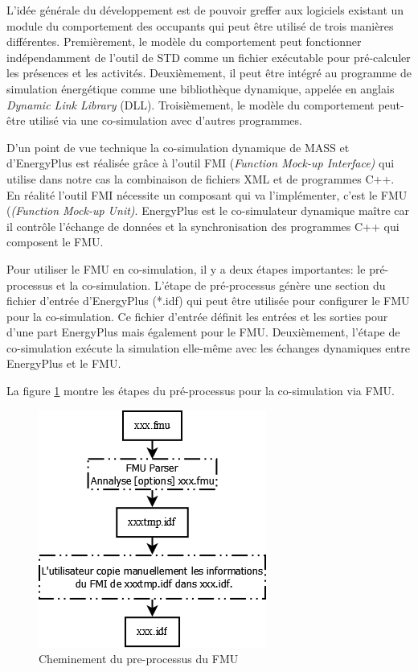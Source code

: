 L'idée générale du développement est de pouvoir greffer aux logiciels existant un module du comportement des occupants qui peut être utilisé de trois manières différentes. Premièrement, le modèle du comportement peut fonctionner indépendamment de l'outil de STD comme un fichier exécutable pour pré-calculer les présences et les activités. Deuxièmement, il peut être intégré au programme de simulation énergétique comme une bibliothèque dynamique, appelée en anglais \textit{Dynamic Link Library} (DLL). Troisièmement, le modèle du comportement peut-être utilisé via une co-simulation avec d'autres programmes.

D'un point de vue technique la co-simulation dynamique de MASS et d'EnergyPlus est réalisée grâce à l'outil FMI (\textit{Function Mock-up Interface)} qui utilise dans notre cas la combinaison de fichiers XML et de programmes C++. En réalité l'outil FMI nécessite un composant qui va l'implémenter, c'est le FMU (\textit{(Function Mock-up Unit)}. EnergyPlus est le co-simulateur dynamique maître car il contrôle l'échange de données et la synchronisation des programmes C++ qui composent le FMU.

Pour utiliser le FMU en co-simulation, il y a deux étapes importantes: le pré-processus et la co-simulation. L'étape de pré-processus génère une section du fichier d'entrée d'EnergyPlus (*.idf) qui peut être utilisée pour configurer le FMU pour la co-simulation. Ce fichier d'entrée définit les entrées et les sorties pour d'une part EnergyPlus mais également pour le FMU. Deuxièmement, l'étape de co-simulation exécute la simulation elle-même avec les échanges dynamiques entre EnergyPlus et le FMU.

La figure \ref{fig:FMU} montre les étapes du pré-processus pour la co-simulation via FMU.

\begin{figure}[H]
\centering
\includegraphics[scale=0.4]{Images/FMU_Pre-process}
\caption{Cheminement du pre-processus du FMU}
\label{fig:FMU}
\end{figure}


